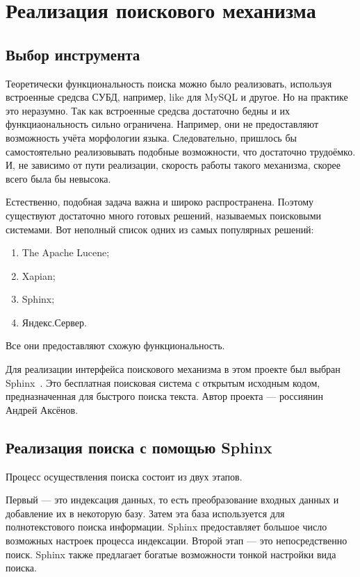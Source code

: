 \section{Реализация поискового механизма}


\subsection{Выбор инструмента}

Теоретически функциональность поиска можно было реализовать, используя
встроенные средсва СУБД, например, like для MySQL и другое.
Но на практике это неразумно.
Так как встроенные средсва достаточно бедны и их функциаональность сильно ограничена.
Например, они не предоставляют возможность учёта морфологии языка.
Следовательно, пришлось бы самостоятельно реализовывать подобные возможности, что достаточно трудоёмко.
И, не зависимо от пути реализации, скорость работы такого механизма, скорее всего была бы невысока.


Естественно, подобная задача важна и широко распространена.
Пoэтому существуют достаточно много готовых решений, называемых поисковыми системами.
Вот неполный список одних из самых популярных решений:
\begin{enumerate}
    \item The Apache Lucene;
    \item Xapian;
    \item Sphinx;
    \item Яндекс.Сервер.
\end{enumerate}

Все они предоставляют схожую функциональность.

Для реализации интерфейса поискового механизма в этом проекте был выбран Sphinx~\cite{sphinx}. 
Это бесплатная поисковая система с открытым исходным кодом, 
предназначенная для быстрого поиска текста. 
Автор проекта --- россиянин Андрей Аксёнов.

\subsection{Реализация поиска с помощью Sphinx}

Процесс осуществления поиска состоит из двух этапов.

Первый --- это индексация данных, то есть преобразование входных данных и добавление их в некоторую базу.
Затем эта база используется для полнотекстового поиска информации.
Sphinx предоставляет большое число возможных настроек процесса индексации.
Второй этап --- это непосредственно поиск. Sphinx также предлагает богатые возможности тонкой настройки вида поиска.

